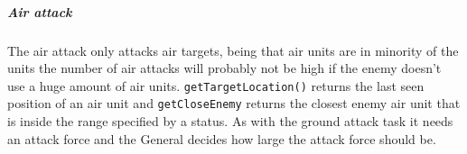 \subparagraph{Air attack}
The air attack only attacks air targets, being that air units are in minority of the units the
number of air attacks will probably not be high if the enemy doesn't use a huge amount of air units.
\texttt{getTargetLocation()} returns the last seen position of an air unit and
\texttt{getCloseEnemy} returns the closest enemy air unit that is inside the range specified by a
status. As with the ground attack task it needs an attack force and the General decides how large
the attack force should be.
